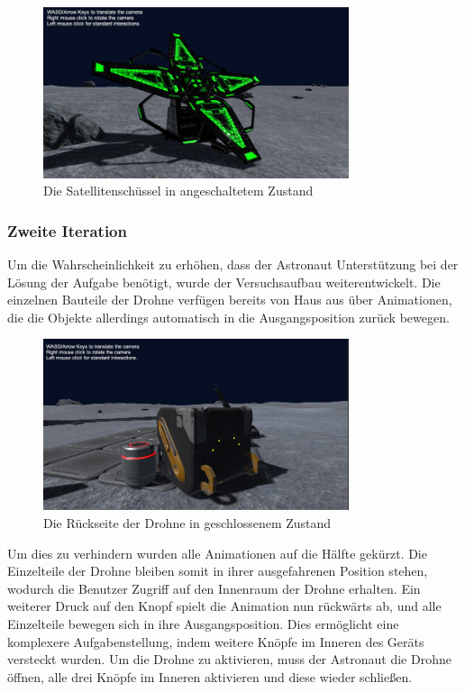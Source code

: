 \begin{figure}[H]
\centering
\includegraphics[width=0.8\textwidth]{SatelliteDish.PNG}
\caption{Die Satellitenschüssel in angeschaltetem Zustand}
\end{figure}

\subsubsection*{Zweite Iteration}
Um die Wahrscheinlichkeit zu erhöhen, dass der Astronaut Unterstützung bei der Lösung der Aufgabe benötigt, wurde der Versuchsaufbau weiterentwickelt. Die einzelnen Bauteile der Drohne verfügen bereits von Haus aus über Animationen, die die Objekte allerdings automatisch in die Ausgangsposition zurück bewegen. 

\begin{figure}[H]
\centering
\includegraphics[width=0.8\textwidth]{DrohneGeschlossen.PNG}
\caption{Die Rückseite der Drohne in geschlossenem Zustand}
\end{figure}

Um dies zu verhindern wurden alle Animationen auf die Hälfte gekürzt. Die Einzelteile der Drohne bleiben somit in ihrer ausgefahrenen Position stehen, wodurch die Benutzer Zugriff auf den Innenraum der Drohne erhalten. Ein weiterer Druck auf den Knopf spielt die Animation nun rückwärts ab, und alle Einzelteile bewegen sich in ihre Ausgangsposition. Dies ermöglicht eine komplexere Aufgabenstellung, indem weitere Knöpfe im Inneren des Geräts versteckt wurden. Um die Drohne zu aktivieren, muss der Astronaut die Drohne öffnen, alle drei Knöpfe im Inneren aktivieren und diese wieder schließen.


